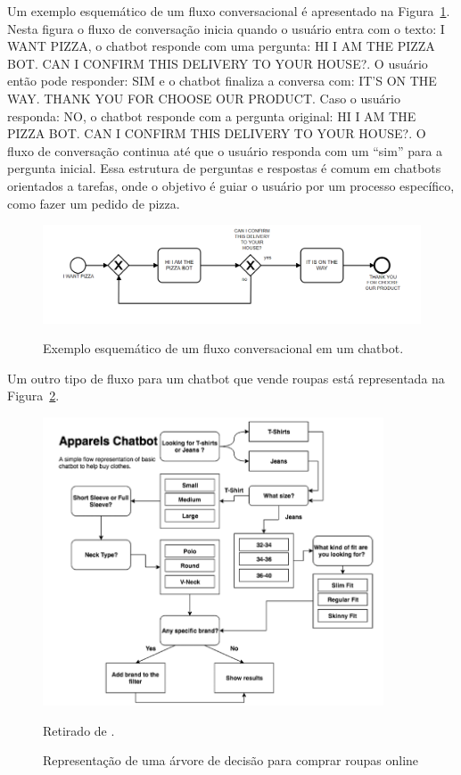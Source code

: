 \documentclass[14pt,a4paper,oneside]{book}
\begin{document}
Um exemplo esquemático de um fluxo conversacional é apresentado na Figura~\ref{fig:fluxo}. Nesta figura o fluxo de conversação inicia quando o usuário entra com o texto: I WANT PIZZA, o chatbot responde com uma pergunta: HI I AM THE PIZZA BOT. CAN I CONFIRM THIS DELIVERY TO YOUR HOUSE?. O usuário então pode responder: SIM e o chatbot finaliza a conversa com: IT'S ON THE WAY. THANK YOU FOR CHOOSE OUR PRODUCT. Caso o usuário responda: NO, o chatbot responde com a pergunta original: HI I AM THE PIZZA BOT. CAN I CONFIRM THIS DELIVERY TO YOUR HOUSE?. O fluxo de conversação continua até que o usuário responda com um ``sim'' para a pergunta inicial. Essa estrutura de perguntas e respostas é comum em chatbots orientados a tarefas, onde o objetivo é guiar o usuário por um processo específico, como fazer um pedido de pizza.

\begin{figure}
	\centering
	\caption{Exemplo esquemático de um fluxo conversacional em um chatbot.}
	\includegraphics[width=1\linewidth]{fig/fluxo.png}
	\label{fig:fluxo}
\end{figure}

Um outro tipo de fluxo para um chatbot que vende roupas está representada na Figura~\ref{fig:representacaodeumaarvore}.

\begin{figure}
\caption{Representação de uma árvore de decisão para comprar roupas online}
\vspace{0.5cm}
    \centering
   	\vspace*{0,2cm}
    \includegraphics[width=0.9\textwidth]{./fig/image14}
    \label{fig:representacaodeumaarvore}
	{
	
	Retirado de \cite{Raj2019}.}
\end{figure}
\end{document}
